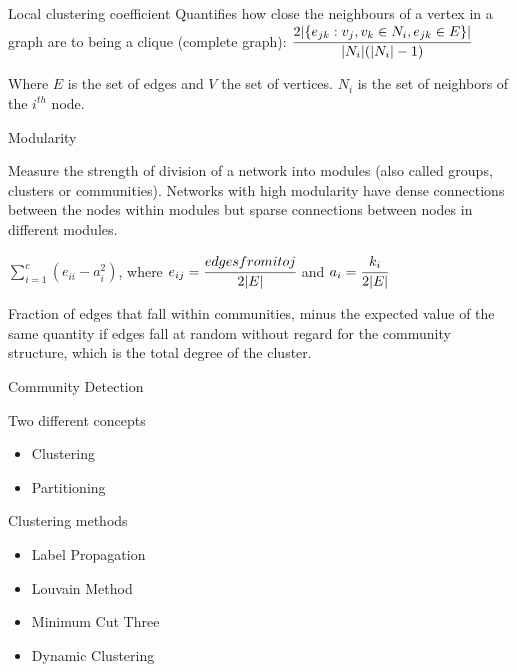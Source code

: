 \documentclass{beamer}
\begin{document}
\begin{frame}

    \begin{block}{Local clustering coefficient}
        Quantifies how close the neighbours of a vertex in a graph are to being a clique (complete graph): $\cfrac{2|\{e_{jk} : v_j, v_k \in N_i, e_{jk} \in E\}|}{|N_i|(|N_i| - 1)}$
    \end{block}

    \begin{block}{}
        Where $E$ is the set of edges and $V$ the set of vertices. $N_i$ is the set of neighbors of the $i^{th}$ node.
    \end{block}

\end{frame}

\begin{frame}{Modularity}
    \begin{block}{}
        Measure the strength of division of a network into modules (also called groups, clusters or communities).
        Networks with high modularity have dense connections between the nodes within modules but sparse connections between nodes in different modules.
    \end{block}
    \begin{block}{}
        $\sum_{i=1}^{c}(e_{ii} - a_{i}^{2})$, where $e_{ij} = \cfrac{edges from i to j}{2|E|}$ and $a_i = \cfrac{k_i}{2|E|}$
    \end{block}

    \begin{block}{}
        Fraction of edges that fall within communities, minus the expected value of the same quantity if edges fall at random without regard for the community structure, which is the total degree of the cluster.
    \end{block}
\end{frame}

\begin{frame}{Community Detection}
    \begin{block}{Two different concepts}
        \begin{itemize}
            \item Clustering
            \item Partitioning
        \end{itemize}
    \end{block}
    \begin{block}{Clustering methods}
        \begin{itemize}
            \item Label Propagation
            \item Louvain Method
            \item Minimum Cut Three
            \item Dynamic Clustering
        \end{itemize}
    \end{block}

\end{frame}
\end{document}
